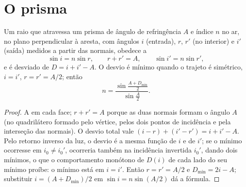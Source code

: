 \section{O prisma}

\begin{proposition}\label{prop:b1:rays-reflection-refraction:prism}
Um raio que atravessa um prisma de ângulo de refringência $A$ e índice $n$ no ar, no
plano perpendicular à aresta, com ângulos $i$ (entrada), $r$, $r'$
(no interior) e $i'$ (saída) medidos a partir das normais, obedece a
\[
\sin i = n \sin r, \qquad r + r' = A, \qquad \sin i' = n \sin r',
\]
e é desviado de $D = i + i' - A$. O desvio é mínimo quando o
trajeto é simétrico, $i = i'$, $r = r' = A/2$; então
\[
n = \frac{\sin\frac{A + D_{\min}}{2}}{\sin\frac{A}{2}} .
\]
\end{proposition}

\begin{proof}
A  em cada face; $r + r' = A$ porque as duas normais formam o
ângulo $A$ (no quadrilátero formado pelo vértice, pelos dois pontos de
incidência e pela interseção das normais). O desvio total vale
$(i - r) + (i' - r') = i + i' - A$. Pelo retorno inverso da luz, o
desvio é a mesma função de $i$ e de $i'$; se o mínimo
ocorresse em $i_0 \neq i_0'$, ocorreria também na incidência
invertida $i_0'$, dando dois mínimos, o que o comportamento monótono de
$D(i)$ de cada lado do seu mínimo proíbe: o mínimo está em $i = i'$.
Então $r = r' = A/2$ e $D_{\min} = 2i - A$; substituir $i = (A +
D_{\min})/2$ em $\sin i = n\sin(A/2)$ dá a fórmula.
\end{proof}

